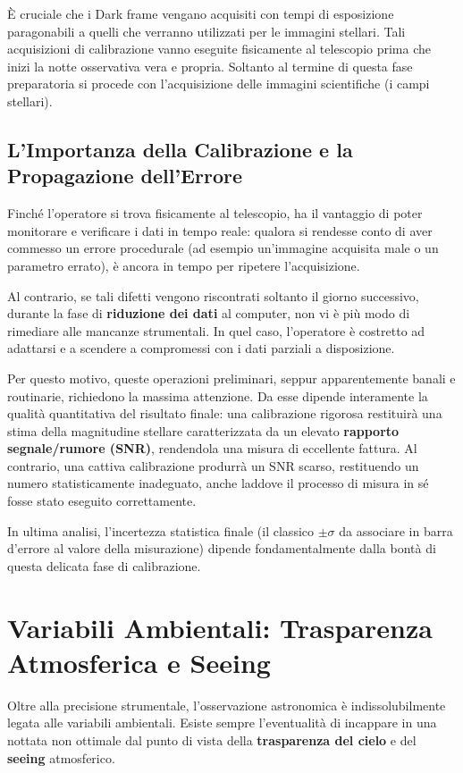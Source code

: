 È cruciale che i Dark frame vengano acquisiti con tempi di esposizione paragonabili a quelli che verranno utilizzati per le immagini stellari. Tali acquisizioni di calibrazione vanno eseguite fisicamente al telescopio prima che inizi la notte osservativa vera e propria. Soltanto al termine di questa fase preparatoria si procede con l'acquisizione delle immagini scientifiche (i campi stellari).

\subsection{L'Importanza della Calibrazione e la Propagazione dell'Errore}

Finché l'operatore si trova fisicamente al telescopio, ha il vantaggio di poter monitorare e verificare i dati in tempo reale: qualora si rendesse conto di aver commesso un errore procedurale (ad esempio un'immagine acquisita male o un parametro errato), è ancora in tempo per ripetere l'acquisizione.

Al contrario, se tali difetti vengono riscontrati soltanto il giorno successivo, durante la fase di \textbf{riduzione dei dati} al computer, non vi è più modo di rimediare alle mancanze strumentali. In quel caso, l'operatore è costretto ad adattarsi e a scendere a compromessi con i dati parziali a disposizione.

Per questo motivo, queste operazioni preliminari, seppur apparentemente banali e routinarie, richiedono la massima attenzione. Da esse dipende interamente la qualità quantitativa del risultato finale: una calibrazione rigorosa restituirà una stima della magnitudine stellare caratterizzata da un elevato \textbf{rapporto segnale/rumore (SNR)}, rendendola una misura di eccellente fattura. Al contrario, una cattiva calibrazione produrrà un SNR scarso, restituendo un numero statisticamente inadeguato, anche laddove il processo di misura in sé fosse stato eseguito correttamente.

In ultima analisi, l'incertezza statistica finale (il classico $\pm \sigma$ da associare in barra d'errore al valore della misurazione) dipende fondamentalmente dalla bontà di questa delicata fase di calibrazione.

\section{Variabili Ambientali: Trasparenza Atmosferica e Seeing}

Oltre alla precisione strumentale, l'osservazione astronomica è indissolubilmente legata alle variabili ambientali. Esiste sempre l'eventualità di incappare in una nottata non ottimale dal punto di vista della \textbf{trasparenza del cielo} e del \textbf{seeing} atmosferico.

